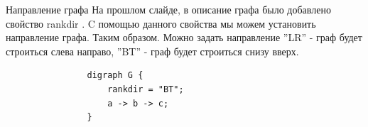 \documentclass{beamer}
\begin{document}
\begin{frame}[fragile]{Направление графа}
	На прошлом слайде, в описание графа было добавлено свойство \color{red}rankdir \color{black}. C помощью данного свойства мы можем установить направление графа. Таким образом. Можно задать направление ''LR'' - граф будет строиться слева направо, ''BT'' - граф будет строиться снизу вверх.
	\newline
	\newline
	\begin{minipage}{0.5\textwidth}
		\begin{verbatim}
				digraph G {
					rankdir = "BT";
					a -> b -> c;
				}
		\end{verbatim}
	\end{minipage}
	\hfill
	\begin{minipage}{0.45\textwidth}
	\end{minipage}
\end{frame}      
\end{document}
